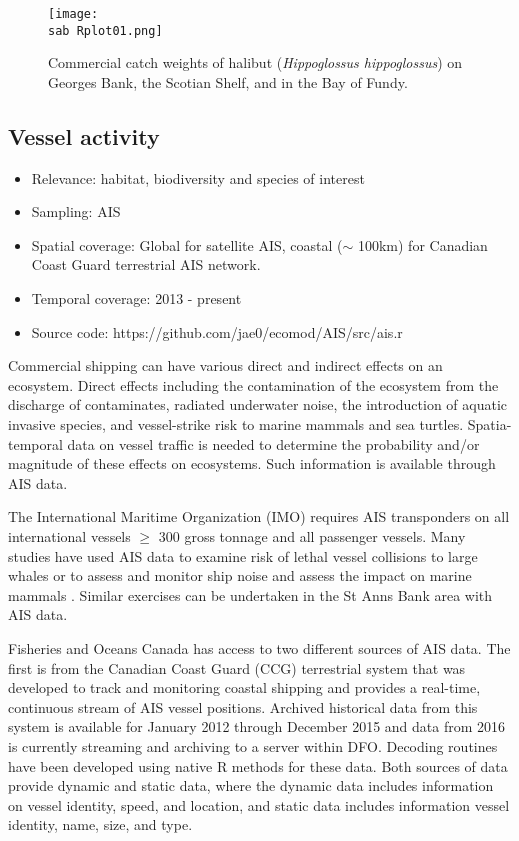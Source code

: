 \documentclass[letterpaper,portrait,11pt]{scrartcl}
\numberwithin{equation}{section}		%
\numberwithin{figure}{section}		%
\numberwithin{table}{section}				%
\newcommand{\ecomod}{\string~/ecomod_data/}   %
\newcommand{\sab}{\ecomod/mpa/sab/}   %
\begin{document}
\begin{figure}[h]
	\centering
	\texttt{[image: \\sab Rplot01.png]}
	\caption{Commercial catch weights of halibut (\textit{Hippoglossus hippoglossus}) on Georges Bank, the Scotian Shelf, and in the Bay of Fundy.}
	\label{fig:halibut}
\end{figure}



\subsection{Vessel activity}

\begin{itemize}
	\item Relevance:  habitat, biodiversity and species of interest
	\item Sampling:  AIS
	\item Spatial coverage: Global for satellite AIS, coastal ($\sim$ 100km) for Canadian Coast Guard terrestrial AIS network.
	\item Temporal coverage: 2013 - present
	\item Source code: https://github.com/jae0/ecomod/AIS/src/ais.r
\end{itemize}	


Commercial shipping can have various direct and indirect effects on an ecosystem. Direct effects including the contamination of the ecosystem from the discharge of contaminates, radiated underwater noise, the introduction of aquatic invasive species, and vessel-strike risk to marine mammals and sea turtles.  Spatia-temporal data on vessel traffic is needed to determine the probability and/or magnitude of these effects on ecosystems.  Such information is available through AIS data.  

The International Maritime Organization (IMO) requires AIS transponders on all international vessels $\geq$ 300 gross tonnage and all passenger vessels.  Many studies have used AIS data to examine risk of lethal vessel collisions to large whales \parencite[e.g.,][ ]{vanderlaan:2009:efficacy, wiley:2011:modeling, redfern2013assessing, guzman2013potential} or to assess and monitor ship noise and assess the impact on marine mammals \parencite{ hatch2008characterizing, mckenna2012underwater, hatch2012quantifying, merchant2014monitoring}. Similar exercises can be undertaken in the St Anns Bank area with AIS data.

Fisheries and Oceans Canada has access to two different sources of AIS data.  The first is from the Canadian Coast Guard (CCG) terrestrial system that was developed to track and monitoring coastal shipping and provides a real-time, continuous stream of AIS vessel positions.  Archived historical data from this system is available for January 2012 through December 2015 and data from 2016 is currently streaming and archiving to a server within DFO. Decoding routines have been developed using native R methods for these data.   Both sources of data provide dynamic and static data, where the dynamic data includes information on vessel identity, speed, and location, and static data includes information vessel identity, name, size, and type.   
\end{document}
